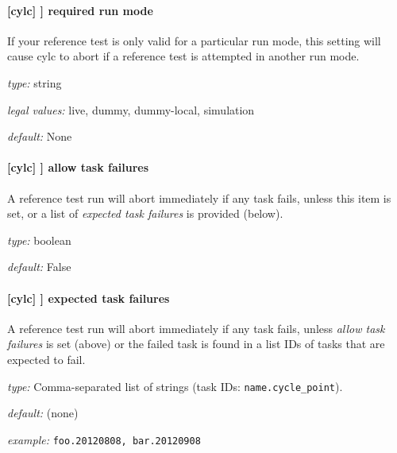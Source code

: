 \paragraph[required run mode]{[cylc] \textrightarrow [[reference test]] \textrightarrow required run mode}

If your reference test is only valid for a particular run mode, this
setting will cause cylc to abort if a reference test is attempted
in another run mode.

\begin{myitemize}
    \item {\em type:} string
    \item {\em legal values:} live, dummy, dummy-local, simulation
    \item {\em default:} None
\end{myitemize}

\paragraph[allow task failures]{[cylc] \textrightarrow [[reference test]] \textrightarrow allow task failures}

A reference test run will abort immediately if any task fails, unless
this item is set, or a list of {\em expected task failures} is provided
(below).

\begin{myitemize}
    \item {\em type:} boolean
    \item {\em default:} False
\end{myitemize}

\paragraph[expected task failures]{[cylc] \textrightarrow [[reference test]] \textrightarrow expected task failures}

A reference test run will abort immediately if any task fails, unless
{\em allow task failures} is set (above) or the failed task is found
in a list IDs of tasks that are expected to fail.

\begin{myitemize}
    \item {\em type:} Comma-separated list of strings (task IDs: \lstinline=name.cycle_point=).
    \item {\em default:} (none)
    \item {\em example:} \lstinline=foo.20120808, bar.20120908=
\end{myitemize}

